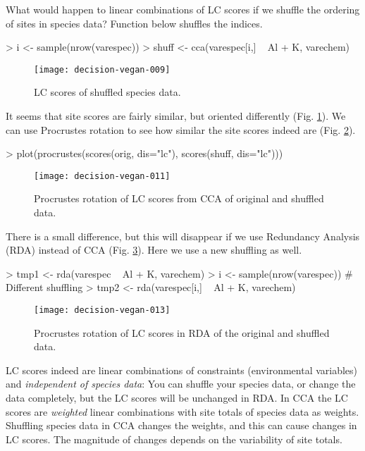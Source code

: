 \documentclass[a4paper,10pt,twocolumn]{article}
\begin{document}
What would happen to linear combinations of LC scores if we shuffle
the ordering of sites in species data?  Function  below
shuffles the indices.
\begin{Schunk}
\begin{Sinput}
> i <- sample(nrow(varespec))
> shuff <- cca(varespec[i,] ~ Al + K, varechem)
\end{Sinput}
\end{Schunk}
\begin{figure}
\texttt{[image: decision-vegan-009]}
\caption{LC scores of shuffled species data.}
\label{fig:ccashuff}
\end{figure}
It seems that site scores are fairly similar, but oriented differently
(Fig. \ref{fig:ccashuff}).  We can use Procrustes rotation to see how
similar the site scores indeed are (Fig. \ref{fig:ccaproc}).
\begin{Schunk}
\begin{Sinput}
> plot(procrustes(scores(orig, dis="lc"), 
                  scores(shuff, dis="lc")))
\end{Sinput}
\end{Schunk}
\begin{figure}
\texttt{[image: decision-vegan-011]}
\caption{Procrustes rotation of LC scores from CCA of original and shuffled data.}
\label{fig:ccaproc}
\end{figure}
There is a small difference, but this will disappear if we use
Redundancy Analysis (RDA) instead of CCA
(Fig. \ref{fig:rdaproc}). Here we use a new shuffling as well.
\begin{Schunk}
\begin{Sinput}
> tmp1 <- rda(varespec ~ Al + K, varechem)
> i <- sample(nrow(varespec)) # Different shuffling
> tmp2 <- rda(varespec[i,] ~ Al + K, varechem)
\end{Sinput}
\end{Schunk}
\begin{figure}
\texttt{[image: decision-vegan-013]}
\caption{Procrustes rotation of LC scores in RDA of the original and shuffled data.}
\label{fig:rdaproc}
\end{figure}

LC scores indeed are linear combinations of constraints (environmental
variables) and \emph{independent of species data}: You can
shuffle your species data, or change the data completely, but the LC
scores will be unchanged in RDA.  In CCA the LC scores are
\emph{weighted} linear combinations with site totals of species data
as weights. Shuffling species data in CCA changes the weights, and
this can cause changes in LC scores.  The magnitude of changes depends
on the variability of site totals.
\end{document}
